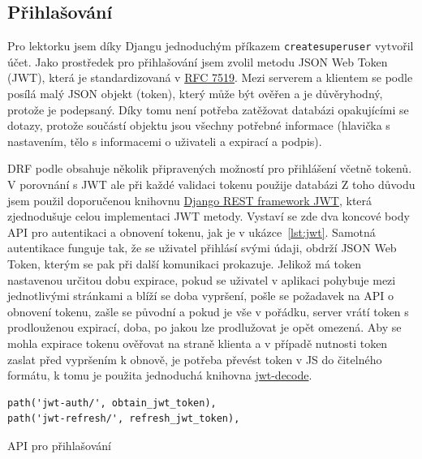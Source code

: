    \subsection{Přihlašování}
    Pro lektorku jsem díky Djangu jednoduchým příkazem \verb|createsuperuser| vytvořil účet. Jako prostředek pro přihlašování jsem zvolil metodu JSON Web Token (JWT), která je standardizovaná v \href{https://tools.ietf.org/html/rfc7519}{RFC 7519}. Mezi serverem a klientem se podle \cite{jwt1} posílá malý JSON objekt (token), který může být ověřen a je důvěryhodný, protože je podepsaný. Díky tomu není potřeba zatěžovat databázi opakujícími se dotazy, protože součástí objektu jsou všechny potřebné informace (hlavička s nastavením, tělo s informacemi o uživateli a expirací a podpis).
    
    DRF podle \cite{drf1} obsahuje několik připravených možností pro přihlášení včetně tokenů. V porovnání s JWT ale při každé validaci tokenu použije databázi Z toho důvodu jsem použil doporučenou knihovnu \href{http://getblimp.github.io/django-rest-framework-jwt/}{Django REST framework JWT}, která zjednodušuje celou implementaci JWT metody. Vystaví se zde dva koncové body API pro autentikaci a obnovení tokenu, jak je v ukázce~\ref{lst:jwt}. Samotná autentikace funguje tak, že se uživatel přihlásí svými údaji, obdrží JSON Web Token, kterým se pak při další komunikaci prokazuje. Jelikož má token nastavenou určitou dobu expirace, pokud se uživatel v aplikaci pohybuje mezi jednotlivými stránkami a blíží se doba vypršení, pošle se požadavek na API o obnovení tokenu, zašle se původní a pokud je vše v pořádku, server vrátí token s prodlouženou expirací, doba, po jakou lze prodlužovat je opět omezená. Aby se mohla expirace tokenu ověřovat na straně klienta a v případě nutnosti token zaslat před vypršením k obnově, je potřeba převést token v JS do čitelného formátu, k tomu je použita jednoduchá knihovna \href{https://github.com/auth0/jwt-decode}{jwt-decode}.
    
    \begin{listing}[ht]
    	\begin{verbatim}
path('jwt-auth/', obtain_jwt_token),
path('jwt-refresh/', refresh_jwt_token),
    	\end{verbatim}
    	\caption{API pro přihlašování}\label{lst:jwt}
    \end{listing}

    
